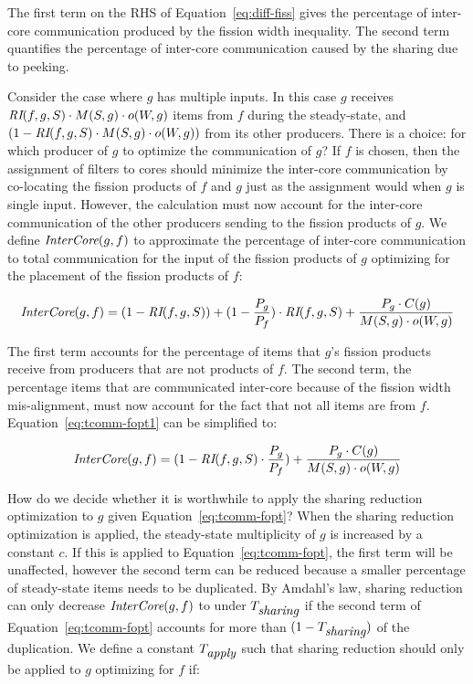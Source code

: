 The first term on the RHS of Equation~\ref{eq:diff-fiss} gives the
percentage of inter-core communication produced by the fission width
inequality.  The second term quantifies the percentage of inter-core
communication caused by the sharing due to peeking.  

Consider the case where $g$ has multiple inputs. In this case $g$
receives $\mbox{\it RI}(f, g, S) \cdot M(S, g) \cdot o(W,g)$ items from $f$
during the steady-state, and $(1 -\mbox{\it RI}(f, g, S) \cdot M(S, g) \cdot
o(W,g))$ from its other producers. There is a choice: for which
producer of $g$ to optimize the communication of $g$? If $f$ is
chosen, then the assignment of filters to cores should minimize the
inter-core communication by co-locating the fission products of $f$
and $g$ just as the assignment would when $g$ is single input.
However, the calculation must now account for the inter-core
communication of the other producers sending to the fission products
of $g$. We define $\mbox{\it InterCore}(g, f)$ to approximate the percentage
of inter-core communication to total communication for the input of
the fission products of $g$ optimizing for the placement of the
fission products of $f$:

\begin{equation}
\label{eq:tcomm-fopt1}
 \mbox{\it InterCore}(g,f)   = (1 - \mbox{\it RI}(f,
   g, S))  + (1 - \frac{P_g}{P_f}) \cdot \mbox{\it RI}(f,
   g, S)   + \frac{P_g \cdot C(g)}{M(S, g) \cdot o(W, g)} 
\end{equation}

\noindent The first term accounts for the percentage of items that $g$'s fission
products receive from producers that are not products of $f$.  The
second term, the percentage items that are communicated inter-core
because of the fission width mis-alignment, must now account for the
fact that not all items are from $f$.  Equation~\ref{eq:tcomm-fopt1}
can be simplified to:

\begin{equation}
\label{eq:tcomm-fopt}
 \mbox{\it InterCore}(g, f)   =  (1 -\mbox{\it RI}(f,g, S) \cdot \frac{P_g}{P_f})
 + \frac{P_g \cdot C(g)}{M(S, g) \cdot o(W, g)}
\end{equation}

How do we decide whether it is worthwhile to apply the sharing
reduction optimization to $g$ given Equation~\ref{eq:tcomm-fopt}? When
the sharing reduction optimization is applied, the steady-state
multiplicity of $g$ is increased by a constant $c$.  If this is
applied to Equation~\ref{eq:tcomm-fopt}, the first term will be
unaffected, however the second term can be reduced because a smaller
percentage of steady-state items needs to be duplicated.  By Amdahl's
law, sharing reduction can only decrease $\mbox{\it InterCore}(g,
f)$ to under $T_{\mbox{\it sharing}}$ if the second term of Equation~\ref{eq:tcomm-fopt}
accounts for more than $(1-T_{\mbox{\it sharing}} )$ of the duplication.  We
define a constant $T_{\mbox{\it apply}}$ such that sharing
reduction should only be applied to $g$ optimizing for $f$ if:

